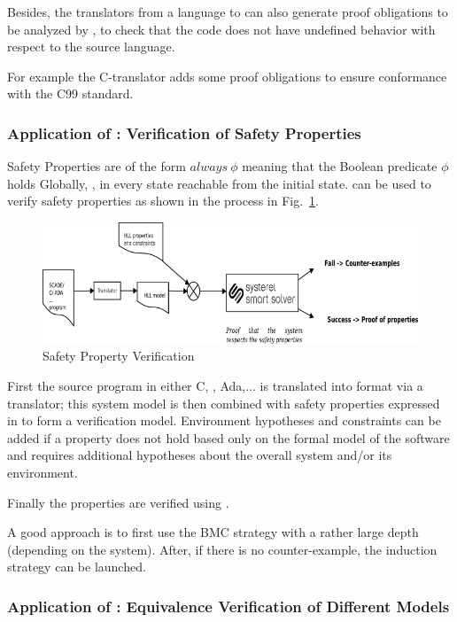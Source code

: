 Besides, the translators from a language to \HLL{} can also generate proof obligations to be analyzed by \smartsolver{},
to check that the code does not have undefined behavior with respect to the source language.

For example the C-translator adds some proof obligations to ensure conformance with the C99 standard.

\subsubsection{Application of \smartsolver{}: Verification of Safety Properties}
\label{sec:verif-safety-prop}

Safety Properties are of the form $always~\phi$ meaning that the Boolean
predicate $\phi$ holds Globally, \ie{}, in every state reachable from the
initial state. \smartsolver{} can be used to verify safety properties as shown
in the process in Fig.~\ref{fig:s3-safety-prop}.


\begin{figure}[h]
  \centering
  \includegraphics[width=1\textwidth]{figures/s3proof}
  \caption{Safety Property Verification}
  \label{fig:s3-safety-prop}
\end{figure}


First the source program in either \textsc{C}, \SCADE{}, Ada,... is translated
into \HLL{} format via a translator; this \HLL{} system model is then
combined with safety properties expressed in \HLL{} to form a verification
model. 
Environment hypotheses and constraints can be added if a property does not hold 
based  only on the formal model of the software and requires additional
hypotheses about the overall system and/or its environment.

Finally the properties are verified using \smartsolver{}.

A good approach is to first use the BMC strategy with a rather large depth
(depending on the system).
After, if there is no counter-example, the induction strategy can be launched.


\subsubsection{Application of \smartsolver{}: Equivalence Verification of Different Models}
\label{sec:equiv-verif-diff}

